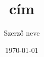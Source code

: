 \documentclass{article}
\begin{document}
\title{cím}
\author{Szerző neve}
\date{\today}
\maketitle
\end{document}
